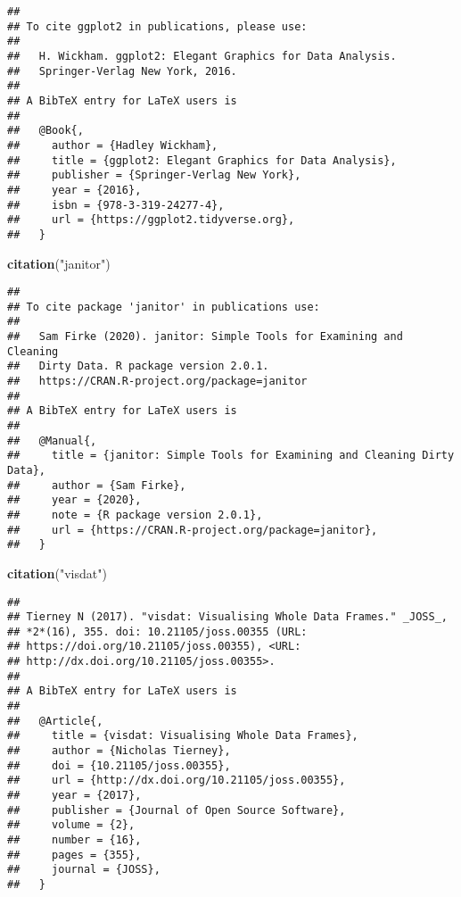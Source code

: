 \documentclass[
]{article}
\newenvironment{Shaded}{\begin{snugshade}}{\end{snugshade}}
\newcommand{\KeywordTok}[1]{\textcolor[rgb]{0.13,0.29,0.53}{\textbf{#1}}}
\newcommand{\NormalTok}[1]{#1}
\newcommand{\StringTok}[1]{\textcolor[rgb]{0.31,0.60,0.02}{#1}}
\begin{document}
\begin{verbatim}
## 
## To cite ggplot2 in publications, please use:
## 
##   H. Wickham. ggplot2: Elegant Graphics for Data Analysis.
##   Springer-Verlag New York, 2016.
## 
## A BibTeX entry for LaTeX users is
## 
##   @Book{,
##     author = {Hadley Wickham},
##     title = {ggplot2: Elegant Graphics for Data Analysis},
##     publisher = {Springer-Verlag New York},
##     year = {2016},
##     isbn = {978-3-319-24277-4},
##     url = {https://ggplot2.tidyverse.org},
##   }
\end{verbatim}

\begin{Shaded}
\begin{Highlighting}[]
\KeywordTok{citation}\NormalTok{(}\StringTok{"janitor"}\NormalTok{)}
\end{Highlighting}
\end{Shaded}

\begin{verbatim}
## 
## To cite package 'janitor' in publications use:
## 
##   Sam Firke (2020). janitor: Simple Tools for Examining and Cleaning
##   Dirty Data. R package version 2.0.1.
##   https://CRAN.R-project.org/package=janitor
## 
## A BibTeX entry for LaTeX users is
## 
##   @Manual{,
##     title = {janitor: Simple Tools for Examining and Cleaning Dirty Data},
##     author = {Sam Firke},
##     year = {2020},
##     note = {R package version 2.0.1},
##     url = {https://CRAN.R-project.org/package=janitor},
##   }
\end{verbatim}

\begin{Shaded}
\begin{Highlighting}[]
\KeywordTok{citation}\NormalTok{(}\StringTok{"visdat"}\NormalTok{)}
\end{Highlighting}
\end{Shaded}

\begin{verbatim}
## 
## Tierney N (2017). "visdat: Visualising Whole Data Frames." _JOSS_,
## *2*(16), 355. doi: 10.21105/joss.00355 (URL:
## https://doi.org/10.21105/joss.00355), <URL:
## http://dx.doi.org/10.21105/joss.00355>.
## 
## A BibTeX entry for LaTeX users is
## 
##   @Article{,
##     title = {visdat: Visualising Whole Data Frames},
##     author = {Nicholas Tierney},
##     doi = {10.21105/joss.00355},
##     url = {http://dx.doi.org/10.21105/joss.00355},
##     year = {2017},
##     publisher = {Journal of Open Source Software},
##     volume = {2},
##     number = {16},
##     pages = {355},
##     journal = {JOSS},
##   }
\end{verbatim}
\end{document}
